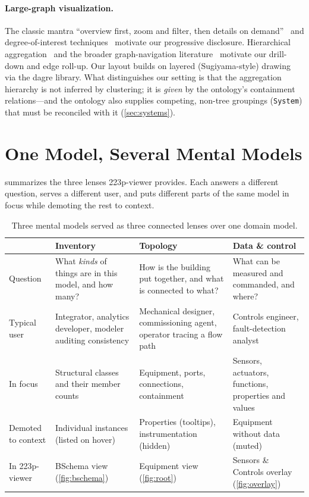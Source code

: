 \documentclass[10pt,twocolumn]{article}
\newcommand{\pred}[1]{\texttt{#1}}   %
\begin{document}
\paragraph{Large-graph visualization.}
The classic mantra ``overview first, zoom and filter, then details on
demand''~\cite{shneiderman1996eyes} and degree-of-interest
techniques~\cite{furnas1986fisheye,vanham2009search} motivate our progressive
disclosure. Hierarchical aggregation~\cite{elmqvist2010hierarchical,abello2006askgraphview}
and the broader graph-navigation literature~\cite{herman2000graph} motivate our
drill-down and edge roll-up. Our layout builds on layered (Sugiyama-style)
drawing~\cite{sugiyama1981methods,gansner1993technique} via the dagre library.
What distinguishes our setting is that the aggregation hierarchy is not inferred
by clustering; it is \emph{given} by the ontology's containment relations---and
the ontology also supplies competing, non-tree groupings (\pred{System}) that must
be reconciled with it (\cref{sec:systems}).

\section{One Model, Several Mental Models}
\label{sec:lenses}

 summarizes the three lenses 223p-viewer provides. Each answers a
different question, serves a different user, and puts different parts of the same
model in focus while demoting the rest to context.

\begin{table}[t]
\centering
\small
\caption{Three mental models served as three connected lenses over one domain
model.}
\label{tab:lenses}
\begin{tabular}{p{2.6cm}p{4.0cm}p{4.0cm}p{4.6cm}}
\toprule
 & \textbf{Inventory} & \textbf{Topology} & \textbf{Data \& control} \\
\midrule
Question & What \emph{kinds} of things are in this model, and how many? &
How is the building put together, and what is connected to what? &
What can be measured and commanded, and where? \\
Typical user & Integrator, analytics developer, modeler auditing consistency &
Mechanical designer, commissioning agent, operator tracing a flow path &
Controls engineer, fault-detection analyst \\
In focus & Structural classes and their member counts & Equipment, ports,
connections, containment & Sensors, actuators, functions, properties and values \\
Demoted to context & Individual instances (listed on hover) & Properties
(tooltips), instrumentation (hidden) & Equipment without data (muted) \\
In 223p-viewer & BSchema view (\cref{fig:bschema}) & Equipment view
(\cref{fig:root}) & Sensors \& Controls overlay (\cref{fig:overlay}) \\
\bottomrule
\end{tabular}
\end{table}
\end{document}
